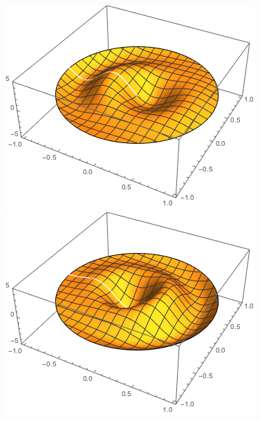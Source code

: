 \documentclass{paper}
\begin{document}
\begin{figure}[!htb]
      \includegraphics[width=\linewidth]{images/wave1.png}
    \endminipage\hfill
      \includegraphics[width=\linewidth]{images/wave2.png}
    \endminipage\hfill

\end{figure}
\end{document}
